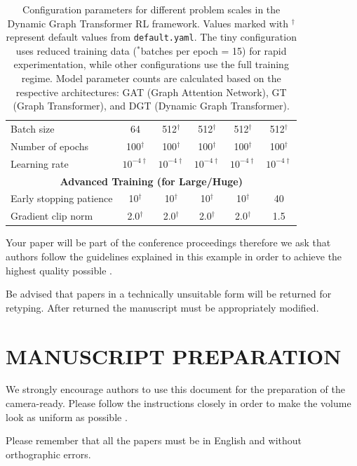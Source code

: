 \documentclass[a4paper,twoside]{article}
\begin{document}
\begin{table}[htbp]
\begin{tabular}{@{}l|ccccc@{}}
Batch size & 64 & 512$^{\dagger}$ & 512$^{\dagger}$ & 512$^{\dagger}$ & 512$^{\dagger}$ \\
Number of epochs & 100$^{\dagger}$ & 100$^{\dagger}$ & 100$^{\dagger}$ & 100$^{\dagger}$ & 100$^{\dagger}$ \\
Learning rate & $10^{-4\dagger}$ & $10^{-4\dagger}$ & $10^{-4\dagger}$ & $10^{-4\dagger}$ & $10^{-4\dagger}$ \\
\midrule
\multicolumn{6}{c}{\textbf{Advanced Training (for Large/Huge)}} \\
\midrule
Early stopping patience & 10$^{\dagger}$ & 10$^{\dagger}$ & 10$^{\dagger}$ & 10$^{\dagger}$ & 40 \\
Gradient clip norm & 2.0$^{\dagger}$ & 2.0$^{\dagger}$ & 2.0$^{\dagger}$ & 2.0$^{\dagger}$ & 1.5 \\
\bottomrule
\end{tabular}%
\caption{Configuration parameters for different problem scales in the Dynamic Graph Transformer RL framework. Values marked with $^{\dagger}$ represent default values from \texttt{default.yaml}. The tiny configuration uses reduced training data ($^{*}$batches per epoch = 15) for rapid experimentation, while other configurations use the full training regime. Model parameter counts are calculated based on the respective architectures: GAT (Graph Attention Network), GT (Graph Transformer), and DGT (Dynamic Graph Transformer).}
\label{tab:config_comparison}
\end{table}



Your paper will be part of the conference proceedings
therefore we ask that authors follow the guidelines explained in
this example in order to achieve the highest quality possible
\cite{Smith98}.

Be advised that papers in a technically unsuitable form will be
returned for retyping. After returned the manuscript must be
appropriately modified.

\section{\uppercase{Manuscript Preparation}}

We strongly encourage authors to use this document for the
preparation of the camera-ready. Please follow the instructions
closely in order to make the volume look as uniform as possible
\cite{Moore99}.

Please remember that all the papers must be in English and without
orthographic errors.
\end{document}
